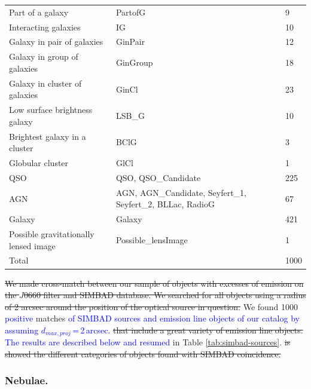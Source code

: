 \documentclass[fleqn,usenatbib]{mnras}
\newcommand{\rlopes}[1]{\textcolor{blue}{#1}}
\begin{document}
\begin{table}
\begin{tabular}{lll}
Part of a galaxy            & PartofG                & 9                 \\
Interacting galaxies        & IG                     & 10                \\
Galaxy in pair of galaxies      & GinPair            & 12                \\
Galaxy in group of galaxies     & GinGroup           & 18                \\
Galaxy in cluster of galaxies   & GinCl              & 23                \\
Low surface brightness galaxy   & LSB\_G             & 10                \\
Brightest galaxy in a cluster   & BClG               & 3                 \\
Globular cluster            & GlCl                   & 1                 \\
QSO                         & QSO, QSO\_Candidate    & 225               \\
AGN                         & AGN, AGN\_Candidate, Seyfert\_1, Seyfert\_2, BLLac, RadioG & 67\\
Galaxy                      &  Galaxy                & 421               \\
Possible gravitationally lensed image & Possible\_lensImage & 1          \\
\hline
Total                       &                               & 1000         \\
\hline
\end{tabular}
\end{table}

\sout{We made cross-match between our sample of objects with excesses of emission on
the $J$0660 filter and SIMBAD database. 
We searched for all objects using a radius of 2 arcsec
around the position of the optical source in question.} 
We found 1000
 \rlopes{positive} matches 
\rlopes{of SIMBAD sources and emission line objects of our catalog by assuming $d_{max,proj}$\,=\,2\,arcsec.} 
\sout{that include a great variety of emission line objects.} \rlopes{The results are described below and resumed} in Table
\ref{tab:simbad-sources}. 
\sout{is showed the different categories of objects found
with SIMBAD coincidence.}

\subsubsection{Nebulae.}
\end{document}
